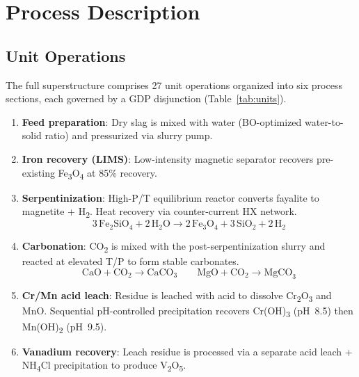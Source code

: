 \documentclass[11pt,a4paper]{article}
\begin{document}
\section{Process Description}

\subsection{Unit Operations}

The full superstructure comprises 27 unit operations organized into six
process sections, each governed by a GDP disjunction (Table~\ref{tab:units}).

\begin{enumerate}[leftmargin=*]
\item \textbf{Feed preparation}: Dry slag is mixed with water (BO-optimized
      water-to-solid ratio) and pressurized via slurry pump.
\item \textbf{Iron recovery (LIMS)}: Low-intensity magnetic separator recovers
      pre-existing Fe\textsubscript{3}O\textsubscript{4} at 85\% recovery.
\item \textbf{Serpentinization}: High-P/T equilibrium reactor converts fayalite
      to magnetite + H\textsubscript{2}. Heat recovery via counter-current HX network.
      \begin{equation}
        3\,\text{Fe}_2\text{SiO}_4 + 2\,\text{H}_2\text{O} \to 2\,\text{Fe}_3\text{O}_4 + 3\,\text{SiO}_2 + 2\,\text{H}_2
      \end{equation}
\item \textbf{Carbonation}: CO\textsubscript{2} is mixed with the post-serpentinization
      slurry and reacted at elevated T/P to form stable carbonates.
      \begin{equation}
        \text{CaO} + \text{CO}_2 \to \text{CaCO}_3 \qquad
        \text{MgO} + \text{CO}_2 \to \text{MgCO}_3
      \end{equation}
\item \textbf{Cr/Mn acid leach}: Residue is leached with acid to dissolve
      Cr\textsubscript{2}O\textsubscript{3} and MnO. Sequential pH-controlled
      precipitation recovers Cr(OH)\textsubscript{3} (pH~8.5) then Mn(OH)\textsubscript{2} (pH~9.5).
\item \textbf{Vanadium recovery}: Leach residue is processed via a separate
      acid leach + NH\textsubscript{4}Cl precipitation to produce V\textsubscript{2}O\textsubscript{5}.
\end{enumerate}
\end{document}

